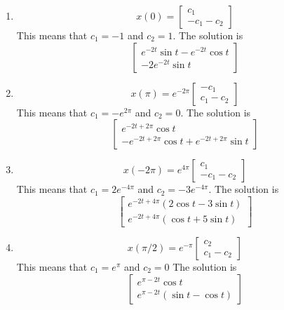 \begin{enumerate}
    \item \[
        x(0) = \begin{bmatrix}
            c_1 \\
            -c_1 -c_2
        \end{bmatrix}
    \]
    This means that $c_1 = -1$ and $c_2 = 1$.
    The solution is 
    \[
        \begin{bmatrix}
            e^{-2t}\sin t - e^{-2t}\cos t \\
            -2e^{-2t}\sin t
        \end{bmatrix}
    \]
    \item \[
        x(\pi) = e^{-2\pi}\begin{bmatrix}
            -c_1 \\
            c_1 -c_2
        \end{bmatrix}
    \]
    This means that $c_1 = -e^{2\pi}$ and $c_2 = 0$.
    The solution is 
    \[
        \begin{bmatrix}
            e^{-2t+2\pi} \cos t\\
            -e^{-2t+2\pi} \cos t + e^{-2t+2\pi} \sin t
        \end{bmatrix}
    \]
    \item \[
        x(-2\pi) = e^{4\pi}\begin{bmatrix}
            c_1 \\
            -c_1 -c_2
        \end{bmatrix}
    \]
    This means that $c_1 = 2e^{-4\pi}$ and $c_2 = -3e^{-4\pi}$.
    The solution is 
    \[
        \begin{bmatrix}
            e^{-2t+4\pi}(2\cos t - 3 \sin t) \\
            e^{-2t+4\pi}(\cos t + 5\sin t)
        \end{bmatrix}
    \]
    \item \[
        x(\pi/2) = e^{-\pi}\begin{bmatrix}
            c_2 \\
            c_1 -c_2
        \end{bmatrix} 
    \]
    This means that $c_1 = e^\pi$ and $c_2 = 0$
    The solution is 
    \[ 
        \begin{bmatrix}
            e^{\pi - 2t}\cos t \\
            e^{\pi - 2t}(\sin t - \cos t)
        \end{bmatrix}
    \]
\end{enumerate}